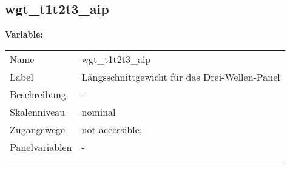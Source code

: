 	
	
	\subsection{wgt\_t1t2t3\_aip}
	\label{subSection:wgt_t1t2t3_aip}

	\noindent\textbf{Variable:}\\
		\begin{tabular}{lL{11.3cm}}
			\label{tableVariable:wgt_t1t2t3_aip}
			Name & wgt\_t1t2t3\_aip \\
			Label & Längsschnittgewicht für das Drei-Wellen-Panel \\
			Beschreibung & - \\
			Skalenniveau & nominal \\
			Zugangswege &
				not-accessible,
 \\
			Panelvariablen & -
			 \\
			 \\
 \\
		\end{tabular}






	
	\newpage
